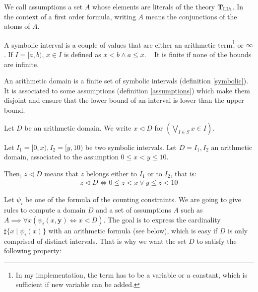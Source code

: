 \begin{definition}[Assumptions]

We call assumptions a set $A$ whose elements are literals of the theory
$\operatorname{\mathbf{T}_{\mathbb{LIA}}}$. In the context of a first order formula, writing $A$
means the conjunctions of the atoms of $A$.

\label{assumptions}

\end{definition}


\begin{definition}

A symbolic interval is a couple of values that are either an arithmetic
term\footnote{In my implementation, the term has to be a variable or a constant,
which is sufficient if new variable can be added.} or $\infty$. If $I = [a, b)$, $x \in I$ is
defined as $x < b \land a \le x$. \newline~\newline
It is finite if none of the bounds are infinite.

\label{symbolic}

\end{definition}


\begin{definition}

An arithmetic domain is a finite set of symbolic intervals (definition
\ref{symbolic}). It is  associated to some assumptions
(definition \ref{assumptions}) which make them disjoint and ensure that
the lower bound of an interval is lower than the upper bound.

\label{arithmetic}

\end{definition}

Let $D$ be an arithmetic domain. We write $x \lhd D$ for
$\left(\bigvee\limits_{I \in S} x \in I\right)$.

\begin{example}
Let $I_1 = [0, x), I_2 = [y, 10)$ be two symbolic intervals. Let $D = {I_1, I_2}$
an arithmetic domain, associated to the assumption $0 \leq x < y \leq 10$.

Then, $z \lhd D$ means that $z$ belongs either to $I_1$ or to $I_2$, that is:
\begin{align*} z \lhd D \iff 0 \leq z < x \lor y \leq z < 10\end{align*}
\end{example}

Let $\psi_i$ be one of the formula of the counting constraints. We are going to
give rules to compute a domain $D$ and a set of assumptions $A$ such as
$A \implies \forall x \left(\psi_i(x, \mathbf{y}) \iff x \lhd D\right)$. The goal is to express the
cardinality $\sharp\{x \mid \psi_i(x)\}$ with an arithmetic formula (see below), which is easy if $D$ is only
comprised of distinct intervals. That is why we want the set $D$
to satisfy the following property:


